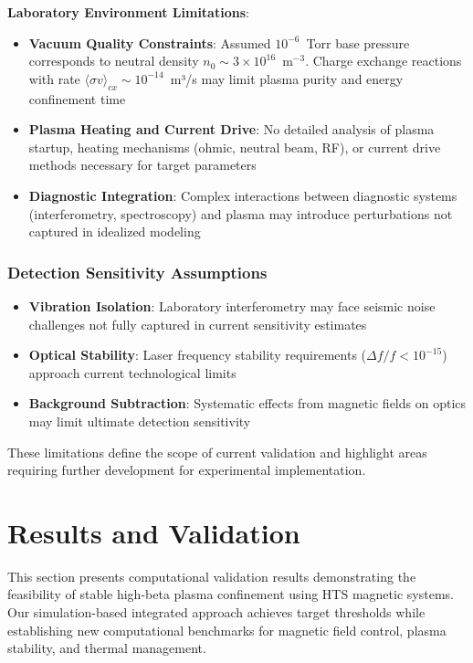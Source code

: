 \documentclass[10pt,twocolumn]{article}
\begin{document}
\textbf{Laboratory Environment Limitations}:
\begin{itemize}
\item \textbf{Vacuum Quality Constraints}: Assumed $10^{-6}$~Torr base pressure corresponds to neutral density $n_0 \sim 3 \times 10^{16}$~m$^{-3}$. Charge exchange reactions with rate $\langle\sigma v\rangle_{cx} \sim 10^{-14}$~m³/s may limit plasma purity and energy confinement time
\item \textbf{Plasma Heating and Current Drive}: No detailed analysis of plasma startup, heating mechanisms (ohmic, neutral beam, RF), or current drive methods necessary for target parameters
\item \textbf{Diagnostic Integration}: Complex interactions between diagnostic systems (interferometry, spectroscopy) and plasma may introduce perturbations not captured in idealized modeling
\end{itemize}

\subsubsection{Detection Sensitivity Assumptions}
\begin{itemize}
\item \textbf{Vibration Isolation}: Laboratory interferometry may face seismic noise challenges not fully captured in current sensitivity estimates
\item \textbf{Optical Stability}: Laser frequency stability requirements ($\Delta f/f < 10^{-15}$) approach current technological limits
\item \textbf{Background Subtraction}: Systematic effects from magnetic fields on optics may limit ultimate detection sensitivity
\end{itemize}

These limitations define the scope of current validation and highlight areas requiring further development for experimental implementation.

\section{Results and Validation}

This section presents computational validation results demonstrating the feasibility of stable high-beta plasma confinement using HTS magnetic systems. Our simulation-based integrated approach achieves target thresholds while establishing new computational benchmarks for magnetic field control, plasma stability, and thermal management.
\end{document}
